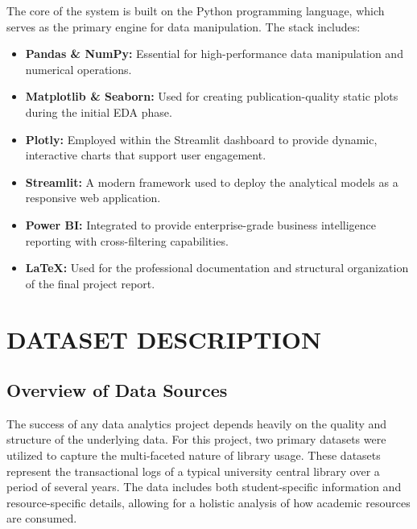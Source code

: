 \documentclass[12pt,a4paper]{report}
\begin{document}
The core of the system is built on the Python programming language, which serves as the primary engine for data manipulation. The stack includes:
\begin{itemize}
    \item \textbf{Pandas \& NumPy:} Essential for high-performance data manipulation and numerical operations.
    \item \textbf{Matplotlib \& Seaborn:} Used for creating publication-quality static plots during the initial EDA phase.
    \item \textbf{Plotly:} Employed within the Streamlit dashboard to provide dynamic, interactive charts that support user engagement.
    \item \textbf{Streamlit:} A modern framework used to deploy the analytical models as a responsive web application.
    \item \textbf{Power BI:} Integrated to provide enterprise-grade business intelligence reporting with cross-filtering capabilities.
    \item \textbf{LaTeX:} Used for the professional documentation and structural organization of the final project report.
\end{itemize}

\chapter{DATASET DESCRIPTION}
\section{Overview of Data Sources}
The success of any data analytics project depends heavily on the quality and structure of the underlying data. For this project, two primary datasets were utilized to capture the multi-faceted nature of library usage. These datasets represent the transactional logs of a typical university central library over a period of several years. The data includes both student-specific information and resource-specific details, allowing for a holistic analysis of how academic resources are consumed.
\end{document}
